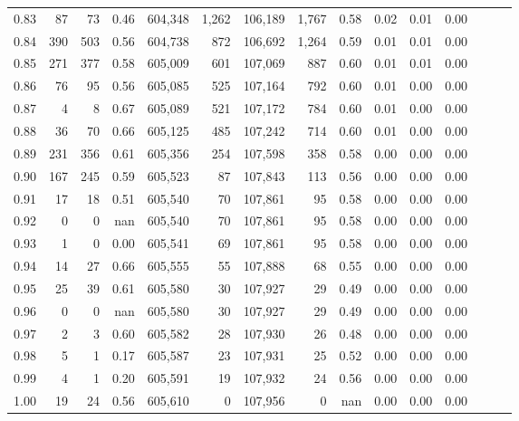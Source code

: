 \begin{tabular}{rrrrrrrrrrrrrrr}
0.83 &      87 &     73 &  0.46 &  604,348 &    1,262 &  106,189 &    1,767 &  0.58 &  0.02 &  0.01 &      0.00 \\
0.84 &     390 &    503 &  0.56 &  604,738 &      872 &  106,692 &    1,264 &  0.59 &  0.01 &  0.01 &      0.00 \\
0.85 &     271 &    377 &  0.58 &  605,009 &      601 &  107,069 &      887 &  0.60 &  0.01 &  0.01 &      0.00 \\
0.86 &      76 &     95 &  0.56 &  605,085 &      525 &  107,164 &      792 &  0.60 &  0.01 &  0.00 &      0.00 \\
0.87 &       4 &      8 &  0.67 &  605,089 &      521 &  107,172 &      784 &  0.60 &  0.01 &  0.00 &      0.00 \\
0.88 &      36 &     70 &  0.66 &  605,125 &      485 &  107,242 &      714 &  0.60 &  0.01 &  0.00 &      0.00 \\
0.89 &     231 &    356 &  0.61 &  605,356 &      254 &  107,598 &      358 &  0.58 &  0.00 &  0.00 &      0.00 \\
0.90 &     167 &    245 &  0.59 &  605,523 &       87 &  107,843 &      113 &  0.56 &  0.00 &  0.00 &      0.00 \\
0.91 &      17 &     18 &  0.51 &  605,540 &       70 &  107,861 &       95 &  0.58 &  0.00 &  0.00 &      0.00 \\
0.92 &       0 &      0 &   nan &  605,540 &       70 &  107,861 &       95 &  0.58 &  0.00 &  0.00 &      0.00 \\
0.93 &       1 &      0 &  0.00 &  605,541 &       69 &  107,861 &       95 &  0.58 &  0.00 &  0.00 &      0.00 \\
0.94 &      14 &     27 &  0.66 &  605,555 &       55 &  107,888 &       68 &  0.55 &  0.00 &  0.00 &      0.00 \\
0.95 &      25 &     39 &  0.61 &  605,580 &       30 &  107,927 &       29 &  0.49 &  0.00 &  0.00 &      0.00 \\
0.96 &       0 &      0 &   nan &  605,580 &       30 &  107,927 &       29 &  0.49 &  0.00 &  0.00 &      0.00 \\
0.97 &       2 &      3 &  0.60 &  605,582 &       28 &  107,930 &       26 &  0.48 &  0.00 &  0.00 &      0.00 \\
0.98 &       5 &      1 &  0.17 &  605,587 &       23 &  107,931 &       25 &  0.52 &  0.00 &  0.00 &      0.00 \\
0.99 &       4 &      1 &  0.20 &  605,591 &       19 &  107,932 &       24 &  0.56 &  0.00 &  0.00 &      0.00 \\
1.00 &      19 &     24 &  0.56 &  605,610 &        0 &  107,956 &        0 &   nan &  0.00 &  0.00 &      0.00 \\
\bottomrule
\end{tabular}
